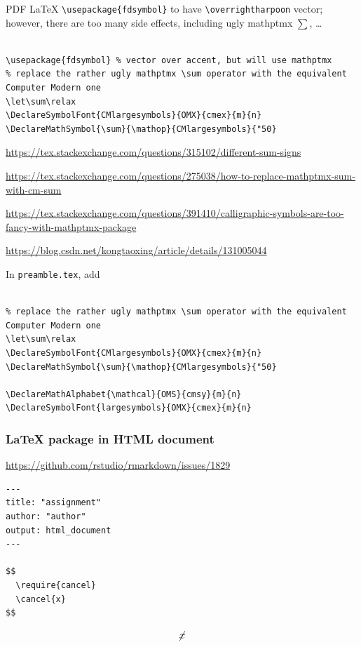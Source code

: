 \documentclass[
]{book}
\theoremstyle{definition}
\theoremstyle{definition}
\theoremstyle{definition}
\theoremstyle{definition}
\theoremstyle{remark}
\begin{document}
PDF LaTeX \texttt{\textbackslash{}usepackage\{fdsymbol\}} to have \texttt{\textbackslash{}overrightharpoon} vector; however, there are too many side effects, including ugly mathptmx \(\sum\), \ldots{}

\begin{verbatim}

\usepackage{fdsymbol} % vector over accent, but will use mathptmx
% replace the rather ugly mathptmx \sum operator with the equivalent Computer Modern one
\let\sum\relax
\DeclareSymbolFont{CMlargesymbols}{OMX}{cmex}{m}{n}
\DeclareMathSymbol{\sum}{\mathop}{CMlargesymbols}{"50}
\end{verbatim}

\url{https://tex.stackexchange.com/questions/315102/different-sum-signs}

\url{https://tex.stackexchange.com/questions/275038/how-to-replace-mathptmx-sum-with-cm-sum}

\url{https://tex.stackexchange.com/questions/391410/calligraphic-symbols-are-too-fancy-with-mathptmx-package}

\url{https://blog.csdn.net/kongtaoxing/article/details/131005044}

In \texttt{preamble.tex}, add

\begin{verbatim}

% replace the rather ugly mathptmx \sum operator with the equivalent Computer Modern one
\let\sum\relax
\DeclareSymbolFont{CMlargesymbols}{OMX}{cmex}{m}{n}
\DeclareMathSymbol{\sum}{\mathop}{CMlargesymbols}{"50}

\DeclareMathAlphabet{\mathcal}{OMS}{cmsy}{m}{n}
\DeclareSymbolFont{largesymbols}{OMX}{cmex}{m}{n}
\end{verbatim}

\hypertarget{latex-package-in-html-document}{%
\subsubsection{LaTeX package in HTML document}\label{latex-package-in-html-document}}

\url{https://github.com/rstudio/rmarkdown/issues/1829}

\begin{verbatim}
---
title: "assignment"
author: "author"
output: html_document
---

$$
  \require{cancel}
  \cancel{x}
$$
\end{verbatim}

\[
  \cancel{x}
\]
\end{document}
